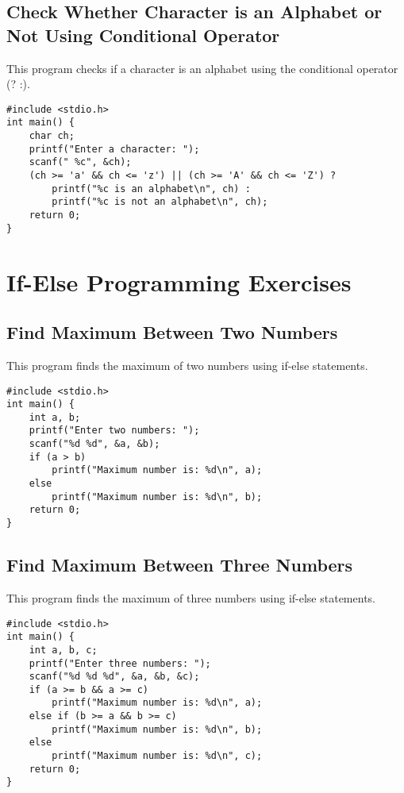\documentclass[a4paper,12pt]{article}
\begin{document}
\newpage

\subsection{Check Whether Character is an Alphabet or Not Using Conditional Operator}
This program checks if a character is an alphabet using the conditional operator (? :).

\begin{lstlisting}[caption={Check Whether Character is an Alphabet or Not Using Conditional Operator}]
#include <stdio.h>
int main() {
    char ch;
    printf("Enter a character: ");
    scanf(" %c", &ch);
    (ch >= 'a' && ch <= 'z') || (ch >= 'A' && ch <= 'Z') ?
        printf("%c is an alphabet\n", ch) :
        printf("%c is not an alphabet\n", ch);
    return 0;
}
\end{lstlisting}

\newpage

\section{If-Else Programming Exercises}

\subsection{Find Maximum Between Two Numbers}
This program finds the maximum of two numbers using if-else statements.

\begin{lstlisting}[caption={Find Maximum Between Two Numbers}]
#include <stdio.h>
int main() {
    int a, b;
    printf("Enter two numbers: ");
    scanf("%d %d", &a, &b);
    if (a > b)
        printf("Maximum number is: %d\n", a);
    else
        printf("Maximum number is: %d\n", b);
    return 0;
}
\end{lstlisting}

\newpage

\subsection{Find Maximum Between Three Numbers}
This program finds the maximum of three numbers using if-else statements.

\begin{lstlisting}[caption={Find Maximum Between Three Numbers}]
#include <stdio.h>
int main() {
    int a, b, c;
    printf("Enter three numbers: ");
    scanf("%d %d %d", &a, &b, &c);
    if (a >= b && a >= c)
        printf("Maximum number is: %d\n", a);
    else if (b >= a && b >= c)
        printf("Maximum number is: %d\n", b);
    else
        printf("Maximum number is: %d\n", c);
    return 0;
}
\end{lstlisting}
\end{document}

